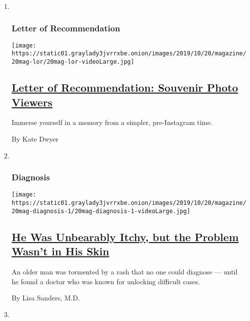 \begin{enumerate}
\def\labelenumi{\arabic{enumi}.}
\item ~
  \hypertarget{letter-of-recommendation}{%
  \subsubsection{Letter of
  Recommendation}\label{letter-of-recommendation}}

  \texttt{[image: https://static01.graylady3jvrrxbe.onion/images/2019/10/20/magazine/20mag-lor/20mag-lor-videoLarge.jpg]}

  \hypertarget{letter-of-recommendation-souvenir-photo-viewers}{%
  \subsection{\texorpdfstring{\href{/2019/10/15/magazine/letter-of-recommendation-souvenir-photo-viewers.html}{Letter
  of Recommendation: Souvenir Photo
  Viewers}}{Letter of Recommendation: Souvenir Photo Viewers}}\label{letter-of-recommendation-souvenir-photo-viewers}}

  Immerse yourself in a memory from a simpler, pre-Instagram time.

  By Kate Dwyer
\item ~
  \hypertarget{diagnosis}{%
  \subsubsection{Diagnosis}\label{diagnosis}}

  \texttt{[image: https://static01.graylady3jvrrxbe.onion/images/2019/10/20/magazine/20mag-diagnosis-1/20mag-diagnosis-1-videoLarge.jpg]}

  \hypertarget{he-was-unbearably-itchy-but-the-problem-wasnt-in-his-skin}{%
  \subsection{\texorpdfstring{\href{/2019/10/16/magazine/he-was-unbearably-itchy-but-the-problem-wasnt-in-his-skin.html}{He
  Was Unbearably Itchy, but the Problem Wasn't in His
  Skin}}{He Was Unbearably Itchy, but the Problem Wasn't in His Skin}}\label{he-was-unbearably-itchy-but-the-problem-wasnt-in-his-skin}}

  An older man was tormented by a rash that no one could diagnose ---
  until he found a doctor who was known for unlocking difficult cases.

  By Lisa Sanders, M.D.
\item ~
  \hypertarget{the-ethicist}{%
}
\end{enumerate}
